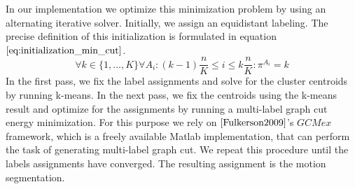 In our implementation we optimize this minimization problem by using an alternating iterative solver. Initially, we assign an equidistant labeling. The precise definition of this initialization is formulated in equation $\ref{eq:initialization_min_cut}$.
\begin{equation}
	\forall k \in \{ 1, \dots, K \} \forall A_i : (k - 1) \frac{n}{K} \leq i \leq k \frac{n}{K} : \pi^{A_i} = k
\label{eq:initialization_min_cut}
\end{equation}
In the first pass, we fix the label assignments and solve for the cluster centroids by running k-means. In the next pass, we fix the centroids using the k-means result and optimize for the assignments by running a multi-label graph cut energy minimization. For this purpose we rely on $\cite{Fulkerson2009}$'s $\textit{GCMex}$ framework, which is a freely available Matlab implementation, that can perform the task of generating multi-label graph cut. We repeat this procedure until the labels assignments have converged. The resulting assignment is the motion segmentation.

